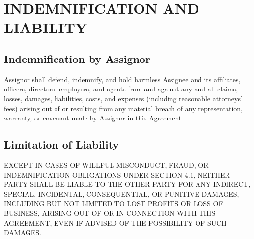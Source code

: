 \section{INDEMNIFICATION AND LIABILITY}

\subsection{Indemnification by Assignor}
Assignor shall defend, indemnify, and hold harmless Assignee and its affiliates, officers, directors, employees, and agents from and against any and all claims, losses, damages, liabilities, costs, and expenses (including reasonable attorneys' fees) arising out of or resulting from any material breach of any representation, warranty, or covenant made by Assignor in this Agreement.

\subsection{Limitation of Liability}
EXCEPT IN CASES OF WILLFUL MISCONDUCT, FRAUD, OR INDEMNIFICATION OBLIGATIONS UNDER SECTION 4.1, NEITHER PARTY SHALL BE LIABLE TO THE OTHER PARTY FOR ANY INDIRECT, SPECIAL, INCIDENTAL, CONSEQUENTIAL, OR PUNITIVE DAMAGES, INCLUDING BUT NOT LIMITED TO LOST PROFITS OR LOSS OF BUSINESS, ARISING OUT OF OR IN CONNECTION WITH THIS AGREEMENT, EVEN IF ADVISED OF THE POSSIBILITY OF SUCH DAMAGES.
